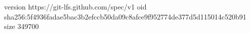 version https://git-lfs.github.com/spec/v1
oid sha256:5f4936fadae5bac3b2efccb50da09c8afce9f952774de377d5d115014c520b91
size 349700

